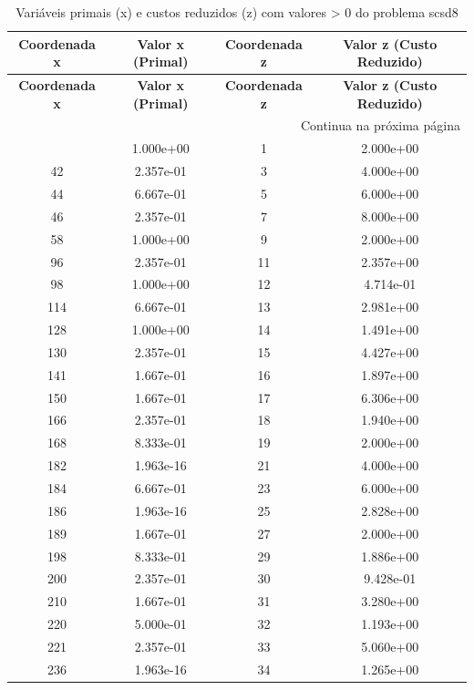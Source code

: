 \documentclass[12pt]{article}
\begin{document}
\begin{longtable}{@{}cccc@{}}
\caption{Variáveis primais (x) e custos reduzidos (z) com valores > 0 do problema scsd8} \\
\toprule
\textbf{Coordenada x} & \textbf{Valor x (Primal)} & \textbf{Coordenada z} & \textbf{Valor z (Custo Reduzido)} \\
\midrule
\endfirsthead

\toprule
\textbf{Coordenada x} & \textbf{Valor x (Primal)} & \textbf{Coordenada z} & \textbf{Valor z (Custo Reduzido)} \\
\midrule
\endhead

\midrule \multicolumn{4}{r}{{Continua na próxima página}} \\ \midrule
\endfoot

\bottomrule
\endlastfoot
28 & 1.000e+00 & 1 & 2.000e+00 \\
42 & 2.357e-01 & 3 & 4.000e+00 \\
44 & 6.667e-01 & 5 & 6.000e+00 \\
46 & 2.357e-01 & 7 & 8.000e+00 \\
58 & 1.000e+00 & 9 & 2.000e+00 \\
96 & 2.357e-01 & 11 & 2.357e+00 \\
98 & 1.000e+00 & 12 & 4.714e-01 \\
114 & 6.667e-01 & 13 & 2.981e+00 \\
128 & 1.000e+00 & 14 & 1.491e+00 \\
130 & 2.357e-01 & 15 & 4.427e+00 \\
141 & 1.667e-01 & 16 & 1.897e+00 \\
150 & 1.667e-01 & 17 & 6.306e+00 \\
166 & 2.357e-01 & 18 & 1.940e+00 \\
168 & 8.333e-01 & 19 & 2.000e+00 \\
182 & 1.963e-16 & 21 & 4.000e+00 \\
184 & 6.667e-01 & 23 & 6.000e+00 \\
186 & 1.963e-16 & 25 & 2.828e+00 \\
189 & 1.667e-01 & 27 & 2.000e+00 \\
198 & 8.333e-01 & 29 & 1.886e+00 \\
200 & 2.357e-01 & 30 & 9.428e-01 \\
210 & 1.667e-01 & 31 & 3.280e+00 \\
220 & 5.000e-01 & 32 & 1.193e+00 \\
221 & 2.357e-01 & 33 & 5.060e+00 \\
236 & 1.963e-16 & 34 & 1.265e+00 \\

\end{longtable}
\end{document}
